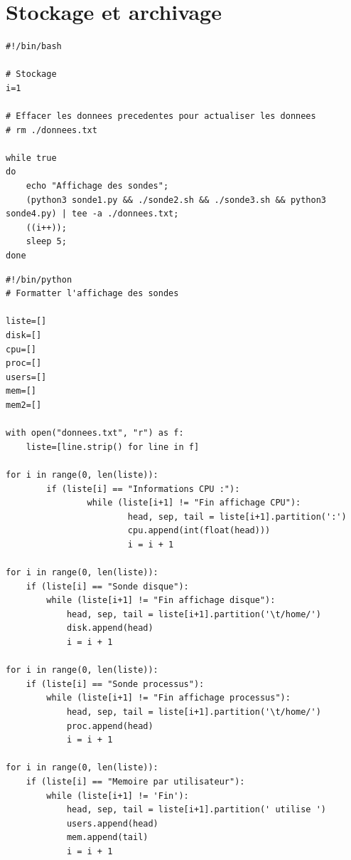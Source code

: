 \documentclass[a4paper, twoside]{report}
\begin{document}
\chapter{Stockage et archivage}

\begin{lstlisting}[style=bash]
#!/bin/bash

# Stockage
i=1

# Effacer les donnees precedentes pour actualiser les donnees
# rm ./donnees.txt

while true
do
    echo "Affichage des sondes";
    (python3 sonde1.py && ./sonde2.sh && ./sonde3.sh && python3 sonde4.py) | tee -a ./donnees.txt;
    ((i++));
    sleep 5;
done

\end{lstlisting}

\begin{lstlisting}[style=python]
#!/bin/python
# Formatter l'affichage des sondes

liste=[]
disk=[]
cpu=[]
proc=[]
users=[]
mem=[]
mem2=[]

with open("donnees.txt", "r") as f:
    liste=[line.strip() for line in f]

for i in range(0, len(liste)):
        if (liste[i] == "Informations CPU :"):
                while (liste[i+1] != "Fin affichage CPU"):
                        head, sep, tail = liste[i+1].partition(':')
                        cpu.append(int(float(head)))
                        i = i + 1

for i in range(0, len(liste)):
    if (liste[i] == "Sonde disque"):
        while (liste[i+1] != "Fin affichage disque"):
            head, sep, tail = liste[i+1].partition('\t/home/')
            disk.append(head)
            i = i + 1

for i in range(0, len(liste)):
    if (liste[i] == "Sonde processus"):
        while (liste[i+1] != "Fin affichage processus"):
            head, sep, tail = liste[i+1].partition('\t/home/')
            proc.append(head)
            i = i + 1

for i in range(0, len(liste)):
    if (liste[i] == "Memoire par utilisateur"):
        while (liste[i+1] != 'Fin'):
            head, sep, tail = liste[i+1].partition(' utilise ')
            users.append(head)
            mem.append(tail)
            i = i + 1

\end{lstlisting}
\end{document}
